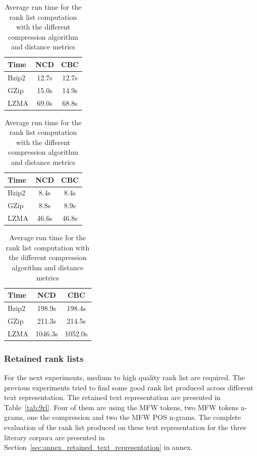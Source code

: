 \begin{table}
  \centering
  \caption{Average run time for the rank list computation with the different compression algorithm and distance metrics}
  \label{tab:compression_evaluation_times}

  \label{tab:compression_evaluation_time_oxquarry}
  \begin{tabular}{l c c}
    \toprule
    Time      & NCD   & CBC \\
    \midrule
    Bzip2     & 12.7s & 12.7s \\
    GZip      & 15.0s & 14.9s \\
    LZMA      & 69.0s & 68.8s \\
    \bottomrule
  \end{tabular}

  \label{tab:compression_evaluation_time_brunet}
  \begin{tabular}{l c c}
    \toprule
    Time      & NCD   & CBC \\
    \midrule
    Bzip2     & 8.4s & 8.4s \\
    GZip      & 8.8s & 8.9s \\
    LZMA      & 46.6s & 46.8s \\
    \bottomrule
  \end{tabular}

  \label{tab:compression_evaluation_time_st_jean}
  \begin{tabular}{l c c}
    \toprule
    Time      & NCD    & CBC \\
    \midrule
    Bzip2     & 198.9s  & 198.4s \\
    GZip      & 211.3s  & 214.5s \\
    LZMA      & 1046.3s & 1052.0s \\
    \bottomrule
  \end{tabular}
\end{table}

\subsubsection{Retained rank lists}

For the next experiments, medium to high quality rank list are required.
The previous experiments tried to find some good rank list produced across different text representation.
The retained text representation are presented in Table~\ref{tab:9rl}.
Four of them are using the MFW tokens, two MFW tokens n-grams, one the compression and two the MFW POS n-grams.
The complete evaluation of the rank list produced on these text representation for the three literary corpora are presented in Section~\ref{sec:annex_retained_text_representation} in annex.

